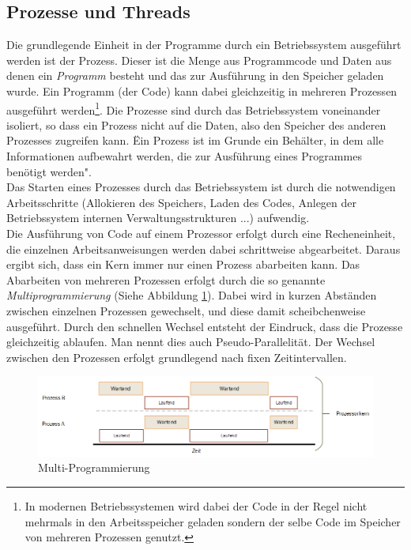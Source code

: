 \subsection{Prozesse und Threads}
Die grundlegende Einheit in der Programme durch ein Betriebssystem ausgeführt werden ist der Prozess. Dieser ist die Menge aus Programmcode und Daten aus denen ein \emph{ Programm} besteht und das zur Ausführung in den Speicher geladen wurde. Ein Programm (der Code) kann dabei gleichzeitig in mehreren Prozessen ausgeführt werden\footnote{In modernen Betriebssystemen wird dabei der Code in der Regel nicht mehrmals in den Arbeitsspeicher geladen sondern der selbe Code im Speicher von mehreren Prozessen genutzt.}. Die Prozesse sind durch das Betriebssystem voneinander isoliert, so dass ein Prozess nicht auf die Daten, also den Speicher des anderen Prozesses zugreifen kann.\cite[S. 71ff]{tanenbaum2016} \"Ein Prozess ist im Grunde ein Behälter, in dem alle Informationen aufbewahrt werden, die zur Ausführung eines Programmes benötigt werden"\cite[S. 71]{tanenbaum2016}.
\\Das Starten eines Prozesses durch das Betriebssystem ist durch die notwendigen Arbeitsschritte (Allokieren des Speichers, Laden des Codes, Anlegen der Betriebssystem internen Verwaltungsstrukturen ...) aufwendig.
\\Die Ausführung von Code auf einem Prozessor erfolgt durch eine Recheneinheit, die einzelnen Arbeitsanweisungen werden dabei schrittweise abgearbeitet. Daraus ergibt sich, dass ein Kern immer nur einen Prozess abarbeiten kann. Das Abarbeiten von mehreren Prozessen erfolgt durch die so genannte \emph{Multiprogrammierung} (Siehe Abbildung \ref{fig:time_slice}). Dabei wird in kurzen Abständen zwischen einzelnen Prozessen gewechselt, und diese damit scheibchenweise ausgeführt. Durch den schnellen Wechsel entsteht der Eindruck, dass die Prozesse gleichzeitig ablaufen. Man nennt dies auch Pseudo-Parallelität.\cite[S. 127ff]{tanenbaum2016} Der Wechsel zwischen den Prozessen erfolgt grundlegend nach fixen Zeitintervallen.

\begin{figure}
	\centering
	\includegraphics[width=0.7\linewidth]{images/time_slice}
	\caption{Multi-Programmierung\cite[S. 128]{tanenbaum2016}}
	\label{fig:time_slice}
\end{figure}


